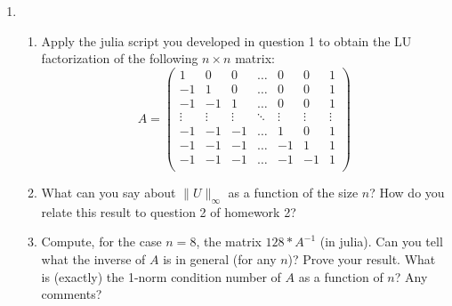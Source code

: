 \documentclass[11pt]{article}
\begin{document}
\begin{enumerate}
	\item \begin{enumerate}
		      \item Apply the julia script you developed in question 1 to obtain the LU factorization of the following \(n \times n\) matrix:
		            \[A = \left(\begin{array}{rrrrrrr}
					            1      & 0      & 0      & \hdots & 0      & 0      & 1      \\
					            -1     & 1      & 0      & \hdots & 0      & 0      & 1      \\
					            -1     & -1     & 1      & \hdots & 0      & 0      & 1      \\
					            \vdots & \vdots & \vdots & \ddots & \vdots & \vdots & \vdots \\
					            -1     & -1     & -1     & \hdots & 1      & 0      & 1      \\
					            -1     & -1     & -1     & \hdots & -1     & 1      & 1      \\
					            -1     & -1     & -1     & \hdots & -1     & -1     & 1      \\
				            \end{array}\right)\]
		      \item What can you say about \(\lVert U \rVert_\infty\) as a function of the size \(n\)?  How do you relate this result to question 2 of homework 2?
		      \item Compute, for the case \(n=8\), the matrix \(128 * A^{-1}\) (in julia).  Can you tell what the inverse of \(A\) is in general (for any \(n\))?  Prove your result.  What is (exactly) the 1-norm condition number of \(A\) as a function of \(n\)?  Any comments?
	      \end{enumerate}

\end{enumerate}
\end{document}
